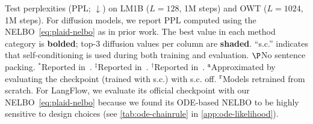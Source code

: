 \documentclass{article}
\begin{document}
\begin{table}[t]
  \caption{\small Test perplexities (PPL; $\downarrow$) on LM1B ($L=128$, 1M steps) and OWT ($L=1024$, 1M steps). For diffusion models, we report PPL computed using the NELBO~\cref{eq:plaid-nelbo} as in prior work.  The best value in each method category is \textbf{bolded}; top-3 diffusion values per column are \textbf{shaded}. ``s.c.'' indicates that self-conditioning is used during both training and evaluation. $\P$No sentence packing. $^*$Reported in~\citet{he2022diffusionbert}. $^\ddag$Reported in~\citet{sahoo2025the}. $^\dag$Reported in~\citet{sahoo2025esoteric}. $^\texttt{a}$Approximated by evaluating the checkpoint (trained with s.c.) with s.c. off. $^\texttt{r}$Models retrained from scratch. For LangFlow, we evaluate its official checkpoint with our NELBO~\cref{eq:plaid-nelbo} because we found its ODE-based NELBO to be highly sensitive to design choices (see \cref{tab:ode-chainrule} in \cref{app:ode-likelihood}).}  
  \vspace{0.5em}
  \label{tab:val-ppl}
  

\end{table}
\end{document}
